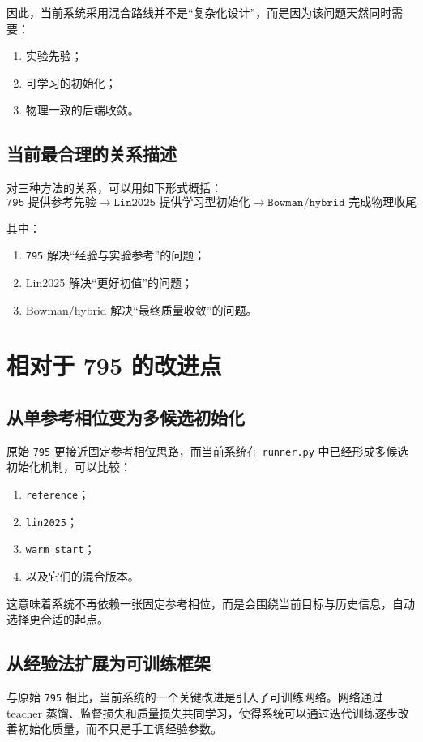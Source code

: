 \documentclass[12pt,a4paper]{ctexart}
\begin{document}
因此，当前系统采用混合路线并不是“复杂化设计”，而是因为该问题天然同时需要：
\begin{enumerate}[label=\arabic*.]
    \item 实验先验；
    \item 可学习的初始化；
    \item 物理一致的后端收敛。
\end{enumerate}

\subsection{当前最合理的关系描述}
对三种方法的关系，可以用如下形式概括：
\[
\texttt{795 提供参考先验} \rightarrow
\texttt{Lin2025 提供学习型初始化} \rightarrow
\texttt{Bowman/hybrid 完成物理收尾}
\]

其中：
\begin{enumerate}[label=\arabic*.]
    \item \texttt{795} 解决“经验与实验参考”的问题；
    \item Lin2025 解决“更好初值”的问题；
    \item Bowman/hybrid 解决“最终质量收敛”的问题。
\end{enumerate}

\section{相对于 795 的改进点}

\subsection{从单参考相位变为多候选初始化}
原始 \texttt{795} 更接近固定参考相位思路，而当前系统在 \texttt{runner.py} 中已经形成多候选初始化机制，可以比较：
\begin{enumerate}[label=\arabic*.]
    \item \texttt{reference}；
    \item \texttt{lin2025}；
    \item \texttt{warm\_start}；
    \item 以及它们的混合版本。
\end{enumerate}

这意味着系统不再依赖一张固定参考相位，而是会围绕当前目标与历史信息，自动选择更合适的起点。

\subsection{从经验法扩展为可训练框架}
与原始 \texttt{795} 相比，当前系统的一个关键改进是引入了可训练网络。网络通过 teacher 蒸馏、监督损失和质量损失共同学习，使得系统可以通过迭代训练逐步改善初始化质量，而不只是手工调经验参数。
\end{document}
